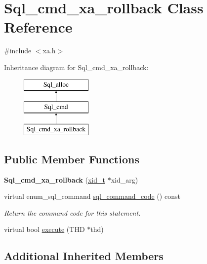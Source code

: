\hypertarget{classSql__cmd__xa__rollback}{}\section{Sql\+\_\+cmd\+\_\+xa\+\_\+rollback Class Reference}
\label{classSql__cmd__xa__rollback}


{\ttfamily \#include $<$xa.\+h$>$}

Inheritance diagram for Sql\+\_\+cmd\+\_\+xa\+\_\+rollback\+:\begin{figure}[H]
\begin{center}
\leavevmode
\includegraphics[height=3.000000cm]{classSql__cmd__xa__rollback}
\end{center}
\end{figure}
\subsection*{Public Member Functions}
\begin{DoxyCompactItemize}
\item 
\mbox{\label{classSql__cmd__xa__rollback_a08425a05b0b34668b2998dac044bdbcf}} 
{\bfseries Sql\+\_\+cmd\+\_\+xa\+\_\+rollback} (\mbox{\hyperlink{structxid__t}{xid\+\_\+t}} $\ast$xid\+\_\+arg)
\item 
\mbox{\label{classSql__cmd__xa__rollback_ad7dbd456e047d222a95f11392900cf3e}} 
virtual enum\+\_\+sql\+\_\+command \mbox{\hyperlink{classSql__cmd__xa__rollback_ad7dbd456e047d222a95f11392900cf3e}{sql\+\_\+command\+\_\+code}} () const
\begin{DoxyCompactList}\small\item\em Return the command code for this statement. \end{DoxyCompactList}\item 
virtual bool \mbox{\hyperlink{classSql__cmd__xa__rollback_ab6ad1f2611953c4c083908827b1e7997}{execute}} (T\+HD $\ast$thd)
\end{DoxyCompactItemize}
\subsection*{Additional Inherited Members}



